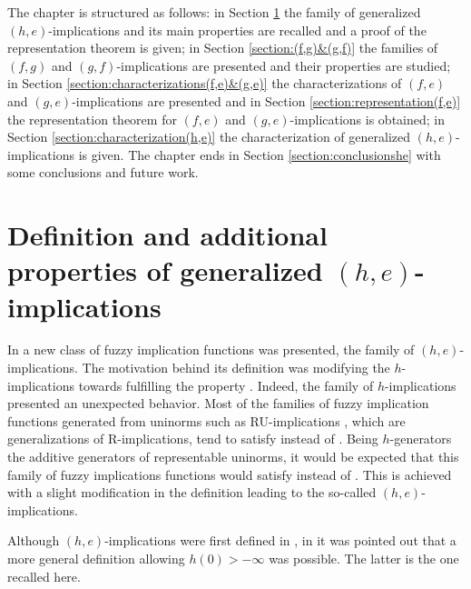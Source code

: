 The chapter is structured as follows:  in Section \ref{section:generalized(h,e)impl} the family of generalized $(h,e)$-implications and its main properties are recalled and a proof of the representation theorem is given; in Section \ref{section:(f,g)&(g,f)} the families of $(f,g)$ and $(g,f)$-implications are presented and their properties are studied; in Section \ref{section:characterizations(f,e)&(g,e)} the characterizations of $(f,e)$ and $(g,e)$-implications are presented and in Section \ref{section:representation(f,e)} the representation theorem for $(f,e)$ and $(g,e)$-implications is obtained; in Section \ref{section:characterization(h,e)} the characterization of generalized $(h,e)$-implications is given. The chapter ends in Section \ref{section:conclusionshe} with some conclusions and future work.

\section{Definition and additional properties of generalized $(h,e)$-implications}\label{section:generalized(h,e)impl}

In \cite{Massanet2011A} a new class of fuzzy implication functions was presented, the family of $(h,e)$-implications. The motivation behind its definition was modifying the $h$-implications towards fulfilling the property \NPe. Indeed, the family of $h$-implications presented an unexpected behavior. Most of the families of fuzzy implication functions generated from uninorms such as RU-implications \cite{DeBaets1999}, which are generalizations of R-implications, tend to satisfy \NPe instead of \NP. Being $h$-generators the additive generators of representable uninorms, it would be expected that this family of fuzzy implications functions would satisfy \NPe instead of \NP. This is achieved with a slight modification in the definition leading to the so-called $(h,e)$-implications. 

Although $(h,e)$-implications were first defined in \cite[Definition 7]{Massanet2011A}, in \cite{Hlinena2013} it was pointed out that a more general definition allowing $h(0)>-\infty$ was possible. The latter is the one recalled here.

